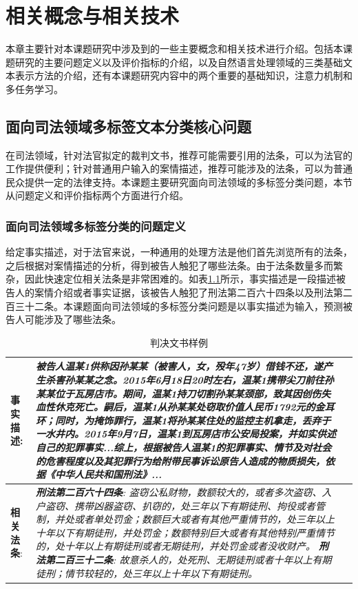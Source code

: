 
\chapter{相关概念与相关技术}
本章主要针对本课题研究中涉及到的一些主要概念和相关技术进行介绍。包括本课题研究的主要问题定义以及评价指标的介绍，以及自然语言处理领域的三类基础文本表示方法的介绍，还有本课题研究内容中的两个重要的基础知识，注意力机制和多任务学习。
\section{面向司法领域多标签文本分类核心问题}
在司法领域，针对法官拟定的裁判文书，推荐可能需要引用的法条，可以为法官的工作提供便利；针对普通用户输入的案情描述，推荐可能涉及的法条，可以为普通民众提供一定的法律支持。本课题主要研究面向司法领域的多标签分类问题，本节从问题定义和评价指标两个方面进行介绍。
\subsection{面向司法领域多标签分类的问题定义}


给定事实描述，对于法官来说，一种通用的处理方法是他们首先浏览所有的法条，之后根据对案情描述的分析，得到被告人触犯了哪些法条。由于法条数量多而繁杂，因此快速定位相关法条是非常困难的。如表\ref{t:example}所示，事实描述是一段描述被告人的案情介绍或者事实证据，该被告人触犯了刑法第二百六十四条以及刑法第二百三十二条。本课题面向司法领域的多标签分类问题是以事实描述为输入，预测被告人可能涉及了哪些法条。
\begin{table}[t!]
    \caption{判决文书样例}
    \label{t:example}
    \centering
    \begin{tabular}{lp{12cm}p{7cm}}
    \hline
    \textbf{事实描述}: &\emph{被告人温某1供称因孙某某（被害人，女，殁年47岁）借钱不还，遂产生杀害孙某某之念。2015年6月18日20时左右，温某1携带尖刀前往孙某某位于瓦房店市。期间，温某1持刀切割孙某某颈部，致其因创伤失血性休克死亡。嗣后，温某1从孙某某处窃取价值人民币1792元的金耳环；同时，为掩饰罪行，温某1将孙某某住处的监控主机拿走，丢弃于一水井内。2015年9月7日，温某1到瓦房店市公安局投案，并如实供述自己的犯罪事实...综上，根据被告人温某1的犯罪事实、情节及对社会的危害程度以及其犯罪行为给附带民事诉讼原告人造成的物质损失，依据《中华人民共和国刑法》...}\\
    \hline
    \textbf{相关法条}: 
    &\emph{\textbf{刑法第二百六十四条}: 盗窃公私财物，数额较大的，或者多次盗窃、入户盗窃、携带凶器盗窃、扒窃的，处三年以下有期徒刑、拘役或者管制，并处或者单处罚金；数额巨大或者有其他严重情节的，处三年以上十年以下有期徒刑，并处罚金；数额特别巨大或者有其他特别严重情节的，处十年以上有期徒刑或者无期徒刑，并处罚金或者没收财产。 \newline
    \textbf{刑法第二百三十二条}: 故意杀人的，处死刑、无期徒刑或者十年以上有期徒刑；情节较轻的，处三年以上十年以下有期徒刑。}\\
    \hline
    \end{tabular}
\end{table}
